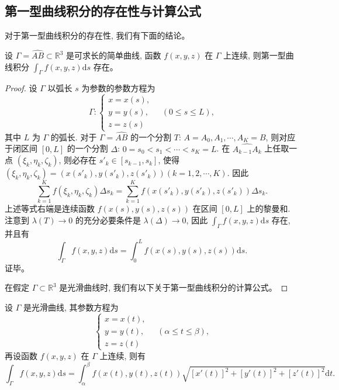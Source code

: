 \documentclass[12pt,fontset=fandol]{ctexart}
\begin{document}
\subsection{第一型曲线积分的存在性与计算公式}

对于第一型曲线积分的存在性, 我们有下面的结论。

\begin{theorem}\label{course-theorem-16-1-1}\quad 设 $\Gamma=\widehat{AB}\subset\mathbb R^3$ 是可求长的简单曲线, 函数 $f(x,y,z)$ 在 $\Gamma$ 上连续, 则第一型曲线积分 $\int_\Gamma f(x,y,z)\mathrm ds$ 存在。

\end{theorem}
\begin{proof}\quad 设 $\Gamma$ 以弧长 $s$ 为参数的参数方程为
\[
  \Gamma:
  \begin{cases}
    x=x(s),\\
    y=y(s),\\
    z=z(s)
  \end{cases}
  \quad(0\leqslant s\leqslant L),
\]
其中 $L$ 为 $\Gamma$ 的弧长. 对于 $\Gamma=\widehat{AB}$ 的一个分割 $T$: $A=A_0,A_1,\cdots,A_K=B$, 则对应于闭区间 $[0,L]$ 的一个分割 $\Delta$: $0=s_0<s_1<\cdots<s_K=L$. 在 $\widehat{A_{k-1}A_k}$ 上任取一点 $(\xi_k,\eta_k,\zeta_k)$, 则必存在 $s'_k\in[s_{k-1},s_k]$, 使得 $(\xi_k,\eta_k,\zeta_k)=(x(s'_k),y(s'_k),z(s'_k))(k=1,2,\cdots,K)$. 因此
\[
  \sum_{k=1}^K f(\xi_k,\eta_k,\zeta_k)\Delta s_k
  =\sum_{k=1}^K f(x(s'_k),y(s'_k),z(s'_k))\Delta s_k.
\]
上述等式右端是连续函数 $f(x(s),y(s),z(s))$ 在区间 $[0,L]$ 上的黎曼和. 注意到 $\lambda(T)\to0$ 的充分必要条件是 $\lambda(\Delta)\to0$, 因此 $\int_\Gamma f(x,y,z)\mathrm ds$ 存在, 并且有
\[
  \int_\Gamma f(x,y,z)\mathrm ds=\int_0^L f(x(s),y(s),z(s))\mathrm ds.
\]
证毕。

在假定 $\Gamma\subset\mathbb R^3$ 是光滑曲线时, 我们有以下关于第一型曲线积分的计算公式。

\end{proof}
\begin{theorem}\label{course-theorem-16-1-2}\quad 设 $\Gamma$ 是光滑曲线, 其参数方程为
\[
  \begin{cases}
    x=x(t),\\
    y=y(t),\\
    z=z(t)
  \end{cases}
  \quad(\alpha\leqslant t\leqslant \beta),
\]
再设函数 $f(x,y,z)$ 在 $\Gamma$ 上连续, 则有
\[
  \int_\Gamma f(x,y,z)\mathrm ds
  =\int_\alpha^\beta f(x(t),y(t),z(t))
  \sqrt{[x'(t)]^2+[y'(t)]^2+[z'(t)]^2}\mathrm dt.
\]

\end{theorem}
\end{document}
